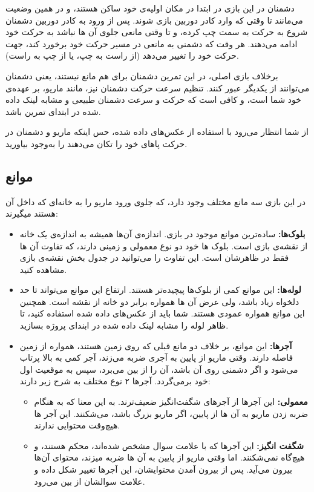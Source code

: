 \documentclass{utap}
\begin{document}
دشمنان در این بازی در ابتدا در مکان اولیه‌ی خود ساکن هستند، و در همین وضعیت می‌مانند تا وقتی که وارد کادر دوربین بازی شوند. پس از ورود به کادر دوربین دشمنان شروع به حرکت به سمت چپ کرده، و تا وقتی مانعی جلو‌ی آن ها نباشد به حرکت خود ادامه می‌دهند. هر وقت که دشمنی به مانعی در مسیر حرکت خود برخورد کند، جهت حرکت خود را تغییر می‌دهد (از راست به چپ، یا از چپ به راست).

برخلاف بازی اصلی، در این تمرین دشمنان برای هم مانع نیستند، یعنی دشمنان می‌توانند از یکدیگر عبور کنند. تنظیم سرعت حرکت دشمنان نیز، مانند ماریو، بر عهده‌ی خود شما است، و کافی است که حرکت و سرعت دشمنان طبیعی و مشابه لینک داده شده در ابتدای تمرین باشد.

از شما انتظار می‌رود با استفاده از عکس‌های داده شده، حس اینکه ماریو و دشمنان در حرکت پاهای خود را تکان می‌دهند را به‌وجود بیاورید.

	\subsection{موانع}
در این بازی سه مانع مختلف وجود دارد، که جلوی ورود ماریو را به خانه‌ای که داخل آن هستند میگیرند:
	\begin{itemize}
		\item
\textbf{بلوک‌ها:}
ساده‌ترین موانع موجود در بازی. اندازه‌ی آن‌ها همیشه به اندازه‌ی یک خانه‌ از نقشه‌ی بازی است. بلوک ها خود دو نوع معمولی و زمینی دارند، که تفاوت آن ها فقط در ظاهرشان است. این تفاوت را می‌توانید در جدول بخش نقشه‌ی بازی مشاهده کنید.
		\item
\textbf{لوله‌ها:}
این موانع کمی از بلوک‌ها پیچیده‌تر هستند. ارتفاع این موانع می‌تواند تا حد دلخواه زیاد باشد، ولی عرض آن ها همواره برابر دو خانه‌ از نقشه است. همچنین این موانع همواره عمودی هستند. شما باید از عکس‌های داده شده استفاده کنید، تا ظاهر لوله را مشابه لینک داده شده در ابندای پروژه بسازید.
		\item
\textbf{آجرها:}
این موانع، بر خلاف دو مانع قبلی که روی زمین هستند، همواره از زمین فاصله دارند. وقتی ماریو از پایین به آجری ضربه می‌زند، آجر کمی به بالا پرتاب می‌شود و اگر دشمنی روی آن‌ باشد، آن را از بین می‌برد، سپس به موقعیت اول خود برمی‌گردد. آجرها ۲ نوع مختلف به شرح زیر دارند:
		\begin{itemize}
			\item
\textbf{معمولی:‌}
این آجرها از آجر‌های شگفت‌انگیز ضعیف‌ترند. به این معنا که به هنگام ضربه زدن ماریو به آن ها از پایین، اگر ماریو بزرگ باشد، می‌شکنند. این آجر ها هیچ‌وقت محتوایی ندارند.
			\item
\textbf{شگفت انگیز:}
این آجرها که با علامت سوال مشخص شده‌اند، محکم هستند، و هیچ‌گاه نمی‌شکنند. اما وقتی ماریو از پایین به آن ها ضربه میزند، محتوای آن‌ها بیرون می‌آید. پس از بیرون آمدن محتوایشان،‌ این آجر‌ها تغییر شکل داده و علامت سوالشان از بین می‌رود.
		\end{itemize}
	\end{itemize}
\end{document}
